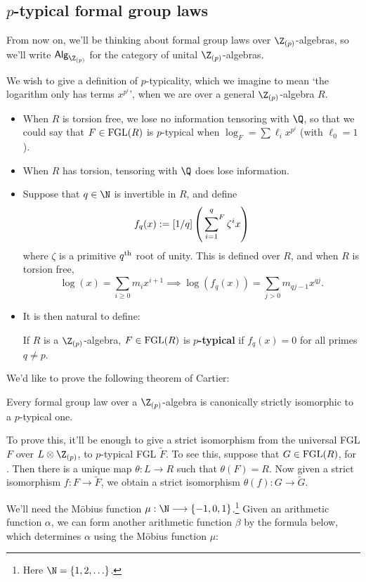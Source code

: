 \documentclass[11pt]{article}
\newcommand\Fsum{\sideset{}{^F}\sum}
\newcommand{\FGL}{\textup{FGL}}
\newcommand{\ZpAlg}{\textsf{Alg}_{\Z_{(p)}}}
\begin{document}
\begin{Formal Group Laws}
\subsection*{$p$-typical formal group laws}
From now on, we'll be thinking about formal group laws over $\Z_{(p)}$-algebras, so we'll write $\ZpAlg$ for the category of unital $\Z_{(p)}$-algebras.
\begin{itemise}
\item We wish to give a definition of $p$-typicality, which we imagine to mean `the logarithm only has terms $x^{p^i}$', when we are over a general $\Z_{(p)}$-algebra $R$.
\begin{itemize}\squishlist
\item When $R$ is torsion free, we lose no information tensoring with $\Q$, so that we could say that $F\in\FGL(R)$ is $p$-typical when $\log_{F}=\sum\ell_ix^{p^i}$ (with $\ell_0=1$).
\item When $R$ has torsion, tensoring with $\Q$ does lose information.
\item Suppose that $q\in\N$ is invertible in $R$, and define
\[f_q(x):=[1/q]\left(\Fsum_{i=1}^q\zeta^ix\right)\]
where $\zeta$ is a primitive $q^\textup{th}$ root of unity. This is defined over $R$, and when $R$ is torsion free,
\[\log(x)=\sum_{i\geq0}m_ix^{i+1}\implies \log(f_q(x))=\sum_{j>0}m_{qj-1}x^{qj}.\]
\item It is then natural to define:
\begin{defn*}
If $R$ is a $\Z_{(p)}$-algebra, $F\in\FGL(R)$ is \textbf{$p$-typical} if $f_{q}(x)=0$ for all primes $q\neq p$.
\end{defn*}
\end{itemize}
\item  We'd like to prove the following theorem of Cartier:
\begin{thm*}[A2.1.18]
Every formal group law over a $\Z_{(p)}$-algebra is canonically strictly isomorphic to a $p$-typical one.
\end{thm*}
To prove this, it'll be enough to give a strict isomorphism from the universal FGL $F$ over $L\otimes \Z_{(p)}$, to $p$-typical FGL $\widetilde{F}$. To see this, suppose that $G\in\FGL(R)$, for \smash{$R\in\ZpAlg$}. Then there is a unique map $\theta:L\to R$ such that $\theta(F)=R$. Now given a strict isomorphism $f:F\to\widetilde{F}$, we obtain a strict isomorphism $\theta(f):G\to\widetilde{G}$.
\begin{shaded}
We'll need the M\"obius function $\mu:\N\to\{-1,0,1\}$.\footnote{Here $\N=\{1,2,\ldots\}$.} Given an arithmetic function $\alpha$, we can form another arithmetic function $\beta$ by the formula below, which determines $\alpha$ using the M\"obius function $\mu$:

\end{shaded}
\end{itemise}
\end{Formal Group Laws}
\end{document}

